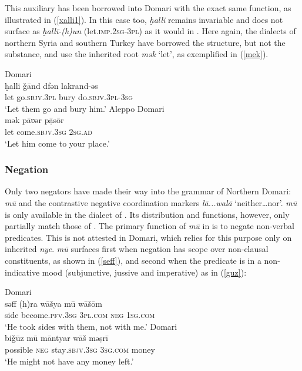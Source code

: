 \documentclass[output=paper]{langsci/langscibook}
\begin{document}
This auxiliary has been borrowed into  Domari with the exact same function, as illustrated in (\ref{xalli1}). In this case too, \textit{ḫalli} remains invariable and does not surface as \textit{ḫallī-(h)un} (let.\textsc{imp.2sg-3pl}) as it would in  . Here again, the dialects of northern Syria and southern Turkey have borrowed the structure, but not the substance, and use the inherited {root} \textit{mək} ‘let’, as exemplified in (\ref{mek}).

\ea \label{xalli1}
{ Domari}\\
\gll ḫalli \v{g}ānd dfən lakrand-əs\\
     let go.\textsc{sbjv.3pl} bury do.\textsc{sbjv.3pl-3sg}\\
\glt ‘Let them go and bury him.’
\ex \label{mek}
{Aleppo Domari}\\
\gll mək pāʋər pạ̄sōr\\
     let come.\textsc{sbjv.3sg} \textsc{2sg.ad}\\
\glt ‘Let him come to your place.’
\z


 \subsubsection{Negation}

Only two  negators have made their way into the grammar of Northern Domari:   \textit{mū} and the contrastive negative {coordination} markers \textit{lā...walā} ‘neither…nor’.  \textit{mū} is only available in the dialect of . Its distribution and functions, however, only partially match those of  . The primary function of \textit{mū} in   is to negate non-verbal predicates. This is not attested in Domari, which relies for this purpose only on inherited \textit{nye}. \textit{mū} surfaces first when {negation} has scope over non-clausal constituents, as shown in (\ref{seff}), and second when the predicate is in a non-indicative mood (subjunctive, jussive and imperative) as in (\ref{guz}):

\ea
{ Domari}\\ \label{seff}
\gll səff (h)ra wāšya mū wāšōm\\
     side become\textsc{.pfv.3sg} \textsc{3pl.com} \textsc{neg} \textsc{1sg.com}\\
\glt ‘He took sides with them, not with me.’
\ex \label{guz}
{ Domari}\\
\gll bi\v{g}ūz mū māntyar wāš məṣrī\\
     possible \textsc{neg} stay\textsc{.sbjv.3sg} \textsc{3sg.com} money\\
\glt ‘He might not have any money left.’
\z
\end{document}
